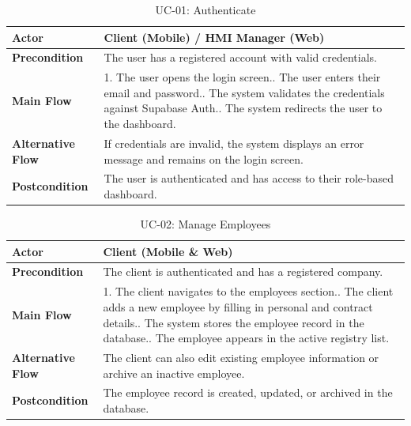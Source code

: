 \begin{table}[H]
\centering
\caption{UC-01: Authenticate}
\label{tab:uc01}
\begin{tabular}{|l|p{10cm}|}
\hline
\textbf{Actor} & Client (Mobile) / HMI Manager (Web) \\
\hline
\textbf{Precondition} & The user has a registered account with valid credentials. \\
\hline
\textbf{Main Flow} & 1. The user opens the login screen.\newline 2. The user enters their email and password.\newline 3. The system validates the credentials against Supabase Auth.\newline 4. The system redirects the user to the dashboard. \\
\hline
\textbf{Alternative Flow} & If credentials are invalid, the system displays an error message and remains on the login screen. \\
\hline
\textbf{Postcondition} & The user is authenticated and has access to their role-based dashboard. \\
\hline
\end{tabular}
\end{table}

\begin{table}[H]
\centering
\caption{UC-02: Manage Employees}
\label{tab:uc02}
\begin{tabular}{|l|p{10cm}|}
\hline
\textbf{Actor} & Client (Mobile \& Web) \\
\hline
\textbf{Precondition} & The client is authenticated and has a registered company. \\
\hline
\textbf{Main Flow} & 1. The client navigates to the employees section.\newline 2. The client adds a new employee by filling in personal and contract details.\newline 3. The system stores the employee record in the database.\newline 4. The employee appears in the active registry list. \\
\hline
\textbf{Alternative Flow} & The client can also edit existing employee information or archive an inactive employee. \\
\hline
\textbf{Postcondition} & The employee record is created, updated, or archived in the database. \\
\hline
\end{tabular}
\end{table}


